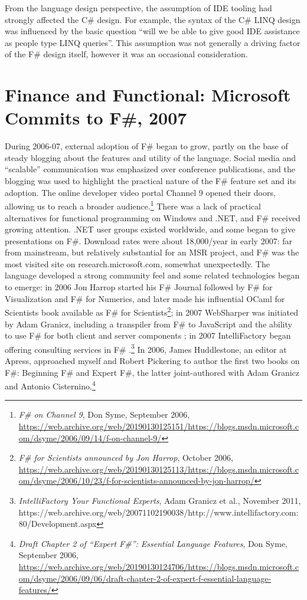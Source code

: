\documentclass[acmsmall]{acmart}\settopmatter{}
\begin{document}
From the language design perspective, the assumption of IDE tooling had strongly affected the C\# design.  For
example, the syntax of the C\# LINQ design was influenced by the basic question “will we be able to give good
IDE assistance as people type LINQ queries”.  This assumption was not generally a driving factor of the F\# design itself, however it was an occasional consideration.



\section*{Finance and Functional: Microsoft Commits to F\#, 2007}

During 2006-07, external adoption of F\# began to grow, partly on the base of steady blogging about the features and utility of the language.
Social media and “scalable” communication was emphasized over conference publications, and the blogging was used to highlight the practical
nature of the F\# feature set and its adoption. The online developer video portal Channel 9 opened their doors, allowing us to reach a broader
audience.\footnote{\textit{F\# on Channel 9}, Don Syme, September 2006, \url{https://web.archive.org/web/20190130125151/https://blogs.msdn.microsoft.com/dsyme/2006/09/14/f-on-channel-9/}}
There was a lack of practical alternatives for functional programming on Windows and .NET, and F\# received growing attention.
.NET user groups existed worldwide, and some began to give presentations on F\#. Download rates were about 18,000/year in early 2007:
far from mainstream, but relatively substantial for an MSR project, and F\# was the most visited site on research.microsoft.com, somewhat
unexpectedly. The language developed a strong community feel and some related technologies began to emerge: in 2006 Jon Harrop started
his F\# Journal followed by F\# for Visualization and F\# for Numerics, and later made his influential OCaml for Scientists book available
as F\# for Scientists\footnote{\textit{F\# for Scientists announced by Jon Harrop}, October 2006, \url{https://web.archive.org/web/20190130125113/https://blogs.msdn.microsoft.com/dsyme/2006/10/23/f-for-scientists-announced-by-jon-harrop/}}; in 2007 WebSharper was initiated by Adam Granicz, including a
transpiler from F\# to JavaScript and the ability to use F\# for both client and server
components \citep{Bjornson2010}; in 2007 IntelliFactory began offering consulting services
in F\# \citep{PeakGranicz2009}.\footnote{\textit{IntelliFactory Your Functional Experts}, Adam Granicz et al., November 2011, https://web.archive.org/web/20071102190038/http://www.intellifactory.com:80/Development.aspx}
In 2006, James Huddlestone, an editor at Apress, approached myself and Robert Pickering to author the first two
books on F\#: Beginning F\# and Expert F\#, the latter joint-authored with Adam Granicz and Antonio Cisternino.\footnote{\textit{Draft Chapter 2 of ``Expert F\#'': Essential Language Features}, Don Syme, September 2006, \url{https://web.archive.org/web/20190130124706/https://blogs.msdn.microsoft.com/dsyme/2006/09/06/draft-chapter-2-of-expert-f-essential-language-features/}}
\end{document}

